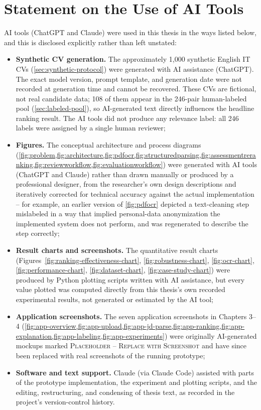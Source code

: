\documentclass[12pt,a4paper,oneside]{report}
\begin{document}
\chapter*{Statement on the Use of AI Tools}
AI tools (ChatGPT and Claude) were used in this thesis in the ways listed below, and this is disclosed explicitly rather than left unstated:
\begin{itemize}
  \item \textbf{Synthetic CV generation.} The approximately 1,000 synthetic English IT CVs (\cref{sec:synthetic-protocol}) were generated with AI assistance (ChatGPT). The exact model version, prompt template, and generation date were not recorded at generation time and cannot be recovered. These CVs are fictional, not real candidate data; 108 of them appear in the 246-pair human-labeled pool (\cref{sec:labeled-pool}), so AI-generated text directly influences the headline ranking result. The AI tools did not produce any relevance label: all 246 labels were assigned by a single human reviewer;
  \item \textbf{Figures.} The conceptual architecture and process diagrams (\cref{fig:problem,fig:architecture,fig:pdfocr,fig:structuredparsing,fig:assessmentreranking,fig:reviewworkflow,fig:evaluationworkflow}) were generated with AI tools (ChatGPT and Claude) rather than drawn manually or produced by a professional designer, from the researcher's own design descriptions and iteratively corrected for technical accuracy against the actual implementation -- for example, an earlier version of \cref{fig:pdfocr} depicted a text-cleaning step mislabeled in a way that implied personal-data anonymization the implemented system does not perform, and was regenerated to describe the step correctly;
  \item \textbf{Result charts and screenshots.} The quantitative result charts (Figures~\ref{fig:ranking-effectiveness-chart}, \ref{fig:robustness-chart}, \ref{fig:ocr-chart}, \ref{fig:performance-chart}, \ref{fig:dataset-chart}, \ref{fig:case-study-chart}) were produced by Python plotting scripts written with AI assistance, but every value plotted was computed directly from this thesis's own recorded experimental results, not generated or estimated by the AI tool;
  \item \textbf{Application screenshots.} The seven application screenshots in Chapters 3--4 (\cref{fig:app-overview,fig:app-upload,fig:app-jd-parse,fig:app-ranking,fig:app-explanation,fig:app-labeling,fig:app-experiments}) were originally AI-generated mockups marked \textsc{Placeholder -- Replace with Screenshot} and have since been replaced with real screenshots of the running prototype;
  \item \textbf{Software and text support.} Claude (via Claude Code) assisted with parts of the prototype implementation, the experiment and plotting scripts, and the editing, restructuring, and condensing of thesis text, as recorded in the project's version-control history.
\end{itemize}
\end{document}
